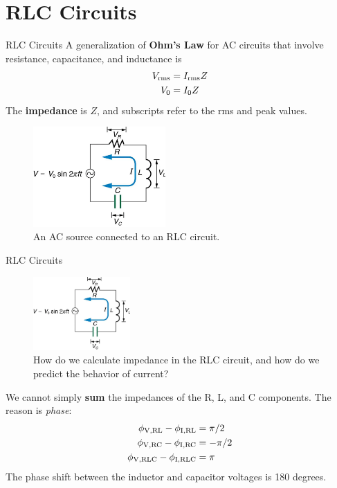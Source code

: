 \documentclass{beamer}
\begin{document}
\section{RLC Circuits}

\begin{frame}{RLC Circuits}
\small
A generalization of \textbf{\alert{Ohm's Law}} for AC circuits that involve resistance, capacitance, and inductance is
\begin{align}
V_{\rm rms} &= I_{\rm rms} Z \\
V_{0} &= I_{0} Z
\end{align}
The \textbf{\alert{impedance}} is $Z$, and subscripts refer to the rms and peak values.
\begin{figure}
\centering
\includegraphics[width=0.45\textwidth]{figures/phase5.png}
\caption{\label{fig:phase5} An AC source connected to an RLC circuit.}
\end{figure}
\end{frame}

\begin{frame}{RLC Circuits}
\footnotesize
\begin{figure}
\centering
\includegraphics[width=0.33\textwidth]{figures/phase5.png}
\caption{\label{fig:phase7} How do we calculate impedance in the RLC circuit, and how do we predict the behavior of current?}
\end{figure}
We cannot simply \textbf{\alert{sum}} the impedances of the R, L, and C components.  The reason is \textit{phase}:
\begin{align}
\phi_{\rm V,RL} - \phi_{\rm I,RL} &= \pi/2 \\
\phi_{\rm V,RC} - \phi_{\rm I,RC} &= -\pi/2 \\
\phi_{\rm V,RLC} - \phi_{\rm I,RLC} &= \pi
\end{align}
The phase shift between the inductor and capacitor voltages is 180 degrees.
\end{frame}
\end{document}
